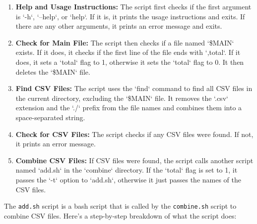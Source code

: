 \documentclass{article}
\begin{document}
\begin{enumerate}
    \item \textbf{Help and Usage Instructions:} The script first checks if the first argument is `-h`, `--help`, or `help`. If it is, it prints the usage instructions and exits. If there are any other arguments, it prints an error message and exits.
    
    \item \textbf{Check for Main File:} The script then checks if a file named `\$MAIN` exists. If it does, it checks if the first line of the file ends with `,total`. If it does, it sets a `total` flag to 1, otherwise it sets the `total` flag to 0. It then deletes the `\$MAIN` file.
    
    \item \textbf{Find CSV Files:} The script uses the `find` command to find all CSV files in the current directory, excluding the `\$MAIN` file. It removes the `.csv` extension and the `./` prefix from the file names and combines them into a space-separated string.
    
    \item \textbf{Check for CSV Files:} The script checks if any CSV files were found. If not, it prints an error message.
    
    \item \textbf{Combine CSV Files:} If CSV files were found, the script calls another script named `add.sh` in the `combine` directory. If the `total` flag is set to 1, it passes the `-t` option to `add.sh`, otherwise it just passes the names of the CSV files.
\end{enumerate}
The \texttt{add.sh} script is a bash script that is called by the \texttt{combine.sh} script to combine CSV files. Here's a step-by-step breakdown of what the script does:
\end{document}
